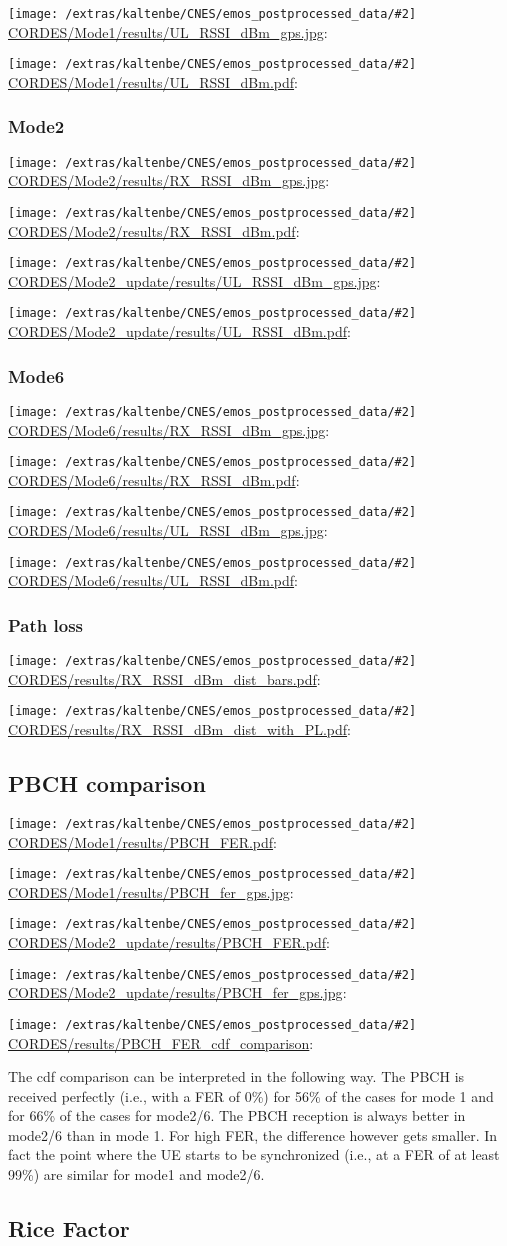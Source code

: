 \documentclass[a4paper,10pt]{article}
\newcommand{\printfile}[2][]{
 \begin{minipage}{8cm}
  \centering
  \texttt{[image: /extras/kaltenbe/CNES/emos\_postprocessed\_data/\#2]}
  \url{#2}: #1

 \end{minipage}
}
\begin{document}
\printfile{CORDES/Mode1/results/UL_RSSI_dBm_gps.jpg}
\printfile{CORDES/Mode1/results/UL_RSSI_dBm.pdf}

\subsubsection{Mode2}

\printfile{CORDES/Mode2/results/RX_RSSI_dBm_gps.jpg}
\printfile{CORDES/Mode2/results/RX_RSSI_dBm.pdf}

\printfile{CORDES/Mode2_update/results/UL_RSSI_dBm_gps.jpg}
\printfile{CORDES/Mode2_update/results/UL_RSSI_dBm.pdf}

\subsubsection{Mode6}
\printfile{CORDES/Mode6/results/RX_RSSI_dBm_gps.jpg}
\printfile{CORDES/Mode6/results/RX_RSSI_dBm.pdf}

\printfile{CORDES/Mode6/results/UL_RSSI_dBm_gps.jpg}
\printfile{CORDES/Mode6/results/UL_RSSI_dBm.pdf}

\subsubsection{Path loss}
\printfile{CORDES/results/RX_RSSI_dBm_dist_bars.pdf}
\printfile{CORDES/results/RX_RSSI_dBm_dist_with_PL.pdf}


\subsection{PBCH comparison}

\printfile{CORDES/Mode1/results/PBCH_FER.pdf}
\printfile{CORDES/Mode1/results/PBCH_fer_gps.jpg}

\printfile{CORDES/Mode2_update/results/PBCH_FER.pdf}
\printfile{CORDES/Mode2_update/results/PBCH_fer_gps.jpg}

\printfile{CORDES/results/PBCH_FER_cdf_comparison}

The cdf comparison can be interpreted in the following way. The PBCH is received perfectly (i.e., with a FER of 0\%) for 56\% of the cases for mode 1 and for 66\% of the cases for mode2/6. The PBCH reception is always better in mode2/6 than in mode 1. For high FER, the difference however gets smaller. In fact the point where the UE starts to be synchronized (i.e., at a FER of at least 99\%) are similar for mode1 and mode2/6. 

\subsection{Rice Factor}
\end{document}
